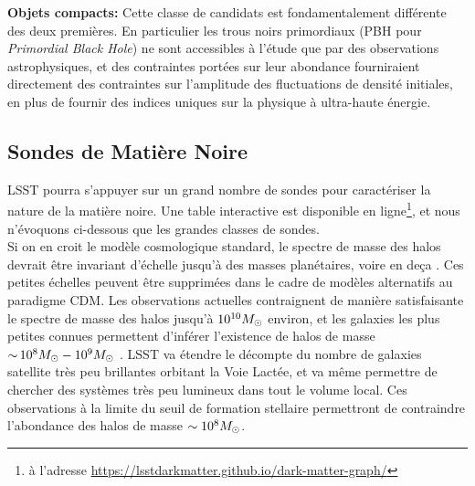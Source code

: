 \documentclass[12pt]{article}
\begin{document}
\noindent \textbf{Objets compacts:} Cette classe de candidats est fondamentalement différente des deux premières. En particulier les trous noirs primordiaux (PBH pour {\it Primordial Black Hole}) ne sont accessibles à l'étude que par des observations astrophysiques, et des contraintes portées sur leur abondance fourniraient directement des contraintes sur l'amplitude des fluctuations de densité initiales, en plus de fournir des indices uniques sur la physique à ultra-haute énergie.


\vspace{-1em} \subsection*{Sondes de Matière Noire} \vspace{-0.5em}
LSST pourra s'appuyer sur un grand nombre de sondes pour caractériser la nature de la matière noire. Une table interactive est disponible en ligne\footnote{à l'adresse \href{https://lsstdarkmatter.github.io/dark-matter-graph/}{https://lsstdarkmatter.github.io/dark-matter-graph/}}, et nous n'évoquons ci-dessous que les grandes classes de sondes.\\
Si on en croit le modèle cosmologique standard, le spectre de masse des halos devrait être invariant d'échelle jusqu'à des masses planétaires, voire en deça \citep[par exemple]{Green:2003un,2005Natur.433..389D,1412.5930}. Ces petites échelles peuvent être supprimées dans le cadre de modèles alternatifs au paradigme CDM.
Les observations actuelles contraignent de manière satisfaisante le spectre de masse des halos jusqu'à $10^{10}M_\odot$ environ, et les galaxies les plus petites connues permettent d'inférer l'existence de halos de masse $ {\sim}\, 10^8 M_\odot - 10^9 M_\odot$ \citep{2017MNRAS.467.2019R,behroozi2018,Jethwa:2018,Kim:2017iwr,Nadler:2018,1807.07093}. 
LSST va étendre le décompte du nombre de galaxies satellite très peu brillantes orbitant la Voie Lactée, et va même permettre de chercher des systèmes très peu lumineux dans tout le volume local. Ces observations à la limite du seuil de formation stellaire permettront de contraindre l'abondance des halos de masse $\sim10^8 M_\odot$.
\end{document}

